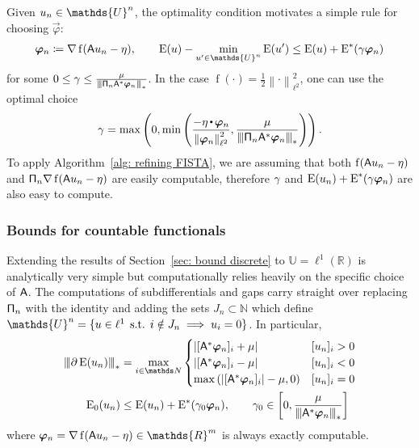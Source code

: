 \documentclass[smallextended]{svjour3}
\let\F\mathds\let\C\mathcal\newcommand{\R}{\F{R}}\newcommand{\A}{\tens{A}}
\newcommand{\norm}[1]{{\left\lVert #1 \right\rVert}}
\newcommand{\Norm}[1]{{\left\vert\kern-0.25ex\left\vert\kern-0.25ex\left\vert #1 \right\vert\kern-0.25ex\right\vert\kern-0.25ex\right\vert}}
\newcommand{\ip}[2]{#1 \vcenter{\hbox{\resizebox{6pt}{!}{\ensuremath\cdot}}} #2}
\newcommand{\op}[1]{\operatorname{#1}}
\newcommand{\1}{\F{1}}
\DeclareMathOperator{\st}{\;s.t.\;}
\newcommand{\data}{\eta}
\newcommand*{\var}[1]{%
	\IfEqCase{#1}{%
		{0}{u}%
		{1}{v}%
		{2}{w}%
	}[u#1]%
}
\newcommand*{\vars}[1]{%
	\IfEqCase{#1}{%
		{0}{\alpha}%
		{1}{\beta}%
		{2}{\gamma}%
		{3}{a}%
		{4}{b}%
		{5}{c}%
	}[k#1]%
}
\begin{document}
	Given $\var0_n\in \F{U}^n$, the optimality condition motivates a simple rule for choosing $\vec{\varphi}$:
	\begin{equation}
		\vec{\varphi}_n\coloneqq \nabla\op{f}(\A\var0_n - \data), \qquad \op{E}(\var0)-\min_{\var0'\in\F{U}^n}\op{E}(\var0') \leq \op{E}(\var0) +\op{E}^*(\vars2\vec{\varphi}_n)
	\end{equation}
	for some $0\leq \vars2\leq\frac{\mu}{\Norm{\tens{\Pi}_n\A^*\vec{\varphi}_n}_*}$. In the case $\op{f}(\cdot)=\frac12\norm{\cdot}_{\ell^2}^2$, one can use the optimal choice
	\begin{equation}
		\vars2 =\max\left(0, \min\left(\frac{-\ip{\data}{\vec{\varphi}_n}}{\norm{\vec{\varphi}_n}_{\ell^2}^2}, \frac{\mu}{\Norm{\tens{\Pi}_n\A^*\vec{\varphi}_n}_*}\right)\right).
	\end{equation}
	To apply Algorithm~\ref{alg: refining FISTA}, we are assuming that both $\op{f}(\A\var0_n-\data)$ and $\tens{\Pi}_n\nabla\op{f}(\A\var0_n-\data)$ are easily computable, therefore $\vars2$ and $\op{E}(\var0_n) +\op{E}^*(\vars2\vec{\varphi}_n)$ are also easy to compute.
	
	\subsubsection{Bounds for countable functionals}
	Extending the results of Section~\ref{sec: bound discrete} to $\F{U}=\ell^1(\R)$ is analytically very simple but computationally relies heavily on the specific choice of $\A$. The computations of subdifferentials and gaps carry straight over replacing $\mathsf{\Pi}_n$ with the identity and adding the sets $J_n\subset\F N$ which define $\F{U}^n = \{\var0\in\ell^1\st i\notin J_n\implies \var0_i=0\}$. In particular,
	\begin{align}
		\Norm{\partial\op{E}(\var0_n)}_* &= \max_{i\in\F N}\begin{cases}
			|[\A^*\vec{\varphi}_n]_i + \mu| & [\var0_n]_i>0
			\\|[\A^*\vec{\varphi}_n]_i - \mu| & [\var0_n]_i<0
			\\\max\left(|[\A^*\vec{\varphi}_n]_i| - \mu, 0\right) & [\var0_n]_i = 0
		\end{cases}
		\\ \op{E}_0(\var0_n) &\leq \op{E}(\var0_n) + \op{E}^*(\vars2_0\vec{\varphi}_n), \qquad \vars2_0\in\left[0,\frac{\mu}{\Norm{\A^*\vec{\varphi}_n}_*}\right]
	\end{align}
	where $\vec{\varphi}_n = \nabla\op{f}(\A\var0_n-\data)\in\R^m$ is always exactly computable.
	
\end{document}

